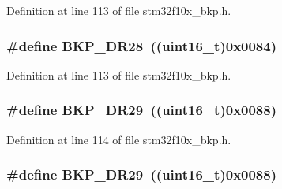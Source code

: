 Definition at line 113 of file stm32f10x\+\_\+bkp.\+h.

\subsubsection[{\texorpdfstring{B\+K\+P\+\_\+\+D\+R28}{BKP_DR28}}]{\setlength{\rightskip}{0pt plus 5cm}\#define B\+K\+P\+\_\+\+D\+R28~(({\bf uint16\+\_\+t})0x0084)}\hypertarget{group___data___backup___register_ga02762501319f1b7e7c01b56d45c45cf9}{}\label{group___data___backup___register_ga02762501319f1b7e7c01b56d45c45cf9}


Definition at line 113 of file stm32f10x\+\_\+bkp.\+h.

\subsubsection[{\texorpdfstring{B\+K\+P\+\_\+\+D\+R29}{BKP_DR29}}]{\setlength{\rightskip}{0pt plus 5cm}\#define B\+K\+P\+\_\+\+D\+R29~(({\bf uint16\+\_\+t})0x0088)}\hypertarget{group___data___backup___register_ga94e935c3e7ce7261d1823e888a8216c5}{}\label{group___data___backup___register_ga94e935c3e7ce7261d1823e888a8216c5}


Definition at line 114 of file stm32f10x\+\_\+bkp.\+h.

\subsubsection[{\texorpdfstring{B\+K\+P\+\_\+\+D\+R29}{BKP_DR29}}]{\setlength{\rightskip}{0pt plus 5cm}\#define B\+K\+P\+\_\+\+D\+R29~(({\bf uint16\+\_\+t})0x0088)}\hypertarget{group___data___backup___register_ga94e935c3e7ce7261d1823e888a8216c5}{}\label{group___data___backup___register_ga94e935c3e7ce7261d1823e888a8216c5}


